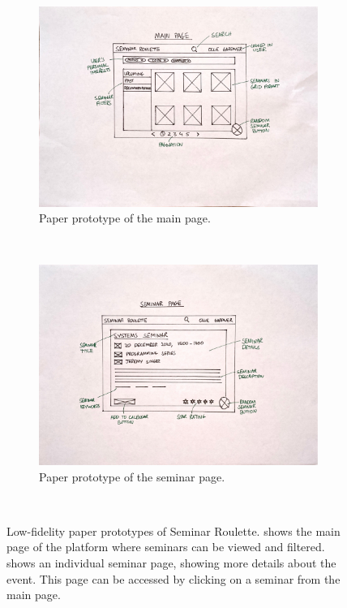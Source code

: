 \documentclass{l4proj}
\begin{document}
\begin{figure}[htb] 
    \centering
    \begin{subfigure}[b]{0.45\textwidth}
        \includegraphics[width=\textwidth]{images/paper_prototype_main.pdf}
        \caption{Paper prototype of the main page.}
        \label{fig:paper_prototype_main}
    \end{subfigure}
    ~
    \begin{subfigure}[b]{0.45\textwidth}
        \includegraphics[width=\textwidth]{images/paper_prototype_seminar.pdf}
        \caption{Paper prototype of the seminar page.}
        \label{fig:paper_prototype_seminar}
    \end{subfigure}
    ~
    \caption{Low-fidelity paper prototypes of Seminar Roulette.  shows the main page of the platform where seminars can be viewed and filtered.  shows an individual seminar page, showing more details about the event. This page can be accessed by clicking on a seminar from the main page.}
    \label{fig:paper_prototypes}
\end{figure}
\end{document}
